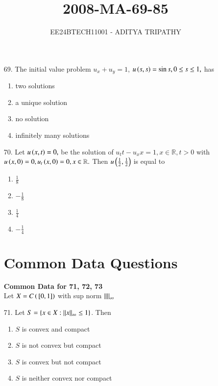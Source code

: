 \documentclass[journal,12pt,onecolumn]{IEEEtran}
\theoremstyle{remark}
\begin{document}

\vspace{3cm}

\title{2008-MA-69-85}
\author{EE24BTECH11001 -  ADITYA TRIPATHY}
\maketitle

\renewcommand{\thefigure}{\theenumi}
\renewcommand{\thetable}{\theenumi}

\begin{enumerate}
	\item[69.] 
	    The initial value problem $u_x + u_y = 1$, $u\left(s, s\right) = \sin s, 0 \le s \le 1,$ has
		\hfill{}
	\begin{multicols}{4}
		\begin{enumerate}
			\item two solutions 
			\columnbreak
			\item a unique solution
			\columnbreak
			\item no solution
			\columnbreak
			\item infinitely many solutions
		\end{enumerate}
	\end{multicols}

\item[70.] Let $u\left(x, t\right) = 0,$ be the solution of $u_tt - u_xx = 1, x \in \mathbb{R}, t > 0$
    with $u\left(x, 0\right) = 0, u_t\left(x, 0\right) = 0, x \in \mathbb{R}.$ Then $u\left(\frac{1}{2}, \frac{1}{2}\right)$ 
        is equal to 
		
		\hfill{}
	\begin{multicols}{4}
		\begin{enumerate}
            \item $\frac{1}{8}$ \columnbreak
            \item $-\frac{1}{8}$ \columnbreak
            \item $\frac{1}{4}$ \columnbreak
            \item $-\frac{1}{4}$ 
		\end{enumerate}
	\end{multicols}

        \section{Common Data Questions}
        \textbf{Common Data for 71, 72, 73}\\
        Let $X = C\left({}\left[0, 1\right]\right)$ with sup norm $\left\lVert \right\rVert_{\infty}$
    \item[71.] Let $S = \{ x \in X : \left\lVert x\right\rVert_{\infty} \le 1 \}$. Then  
		\hfill{}
		\begin{enumerate}
			\item $S$ is convex and compact 
			\item $S$ is not convex but compact
			\item $S$ is convex but not compact 
			\item $S$ is neither convex nor compact
		\end{enumerate}
		

\end{enumerate}
\end{document}
